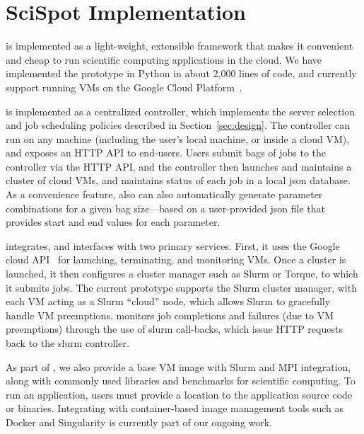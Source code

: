 \vspace*{\subsecspace}
\section{SciSpot Implementation}

\sysname is implemented as a light-weight, extensible framework that makes it convenient and cheap to run scientific computing applications in the cloud.
We have implemented the \sysname prototype in Python in about 2,000 lines of code, and currently support running VMs on the Google Cloud Platform~\cite{gcp}. 

\sysname is implemented as a centralized controller, which implements the server selection and job scheduling policies described in Section~\ref{sec:design}. 
The controller can run on any machine (including the user's local machine, or inside a cloud VM), and exposes an HTTP API to end-users. 
Users submit bags of jobs to the controller via the HTTP API, and the controller then launches and maintains a cluster of cloud VMs, and maintains status of each job in a local json database. 
As a convenience feature, \sysname also can also automatically generate parameter combinations for a given bag size---based on a user-provided json file that provides start and end values for each parameter. 



\sysname integrates, and interfaces with two primary services.
First, it uses the Google cloud API~\cite{gcloud-api} for launching, terminating, and monitoring VMs.
Once a cluster is launched, it then configures a cluster manager such as Slurm or Torque, to which it submits jobs. 
The current \sysname prototype supports the Slurm cluster manager, with each VM acting as a Slurm ``cloud'' node, which allows Slurm to gracefully handle VM preemptions. 
\sysname monitors job completions and failures (due to VM preemptions) through the use of slurm call-backs, which issue HTTP requests back to the slurm controller.

As part of \sysname, we also provide a base VM image with Slurm and MPI integration, along with commonly used libraries and benchmarks for scientific computing. To run an application, users must provide a location to the application source code or binaries. Integrating \sysname with container-based image management tools such as Docker and Singularity is currently part of our ongoing work. 





